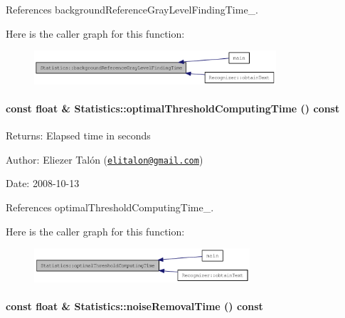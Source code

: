 References backgroundReferenceGrayLevelFindingTime\_\-.

Here is the caller graph for this function:\nopagebreak
\begin{figure}[H]
\begin{center}
\leavevmode
\includegraphics[width=255pt]{class_statistics_d65adc1b3bd1d560408c5f9e06fde3d4_icgraph}
\end{center}
\end{figure}
\hypertarget{class_statistics_3a364709b9fe8dbefd03b3bb45d9a89d}{
\paragraph[optimalThresholdComputingTime]{\setlength{\rightskip}{0pt plus 5cm}const float \& Statistics::optimalThresholdComputingTime () const}\hfill}
\label{class_statistics_3a364709b9fe8dbefd03b3bb45d9a89d}


\begin{Desc}
\item[Returns:]Elapsed time in seconds\end{Desc}
\begin{Desc}
\item[Author:]Eliezer Talón (\href{mailto:elitalon@gmail.com}{\tt elitalon@gmail.com}) \end{Desc}
\begin{Desc}
\item[Date:]2008-10-13 \end{Desc}


References optimalThresholdComputingTime\_\-.

Here is the caller graph for this function:\nopagebreak
\begin{figure}[H]
\begin{center}
\leavevmode
\includegraphics[width=227pt]{class_statistics_3a364709b9fe8dbefd03b3bb45d9a89d_icgraph}
\end{center}
\end{figure}
\hypertarget{class_statistics_2851ad08e1bd9604fe76c78cccc50e84}{
\paragraph[noiseRemovalTime]{\setlength{\rightskip}{0pt plus 5cm}const float \& Statistics::noiseRemovalTime () const}\hfill}
\label{class_statistics_2851ad08e1bd9604fe76c78cccc50e84}


